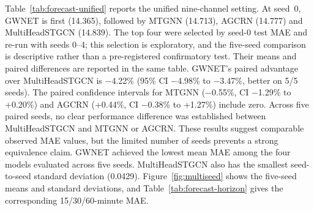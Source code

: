 Table~\ref{tab:forecast-unified} reports the unified nine-channel setting. At
seed~0, GWNET is first (14.365), followed by MTGNN (14.713), AGCRN (14.777) and
MultiHeadSTGCN (14.839). The top four were selected by seed-0 test MAE and
re-run with seeds 0--4; this selection is exploratory, and the five-seed
comparison is descriptive rather than a pre-registered confirmatory test. Their
means and paired differences are reported in the same table. GWNET's paired advantage
over MultiHeadSTGCN is −4.22\% (95\% CI −4.98\% to −3.47\%, better on 5/5
seeds). The paired confidence intervals for MTGNN (−0.55\%, CI −1.29\% to
+0.20\%) and AGCRN (+0.44\%, CI −0.38\% to +1.27\%) include zero. Across five
paired seeds, no clear performance difference was established between
MultiHeadSTGCN and MTGNN or AGCRN. These results suggest comparable observed MAE
values, but the limited number of seeds prevents a strong equivalence claim.
GWNET achieved the lowest mean MAE among the four models evaluated across five
seeds. MultiHeadSTGCN also has the smallest seed-to-seed standard deviation
(0.0429). Figure~\ref{fig:multiseed} shows the five-seed means and standard
deviations, and Table~\ref{tab:forecast-horizon} gives the corresponding
15/30/60-minute MAE.

